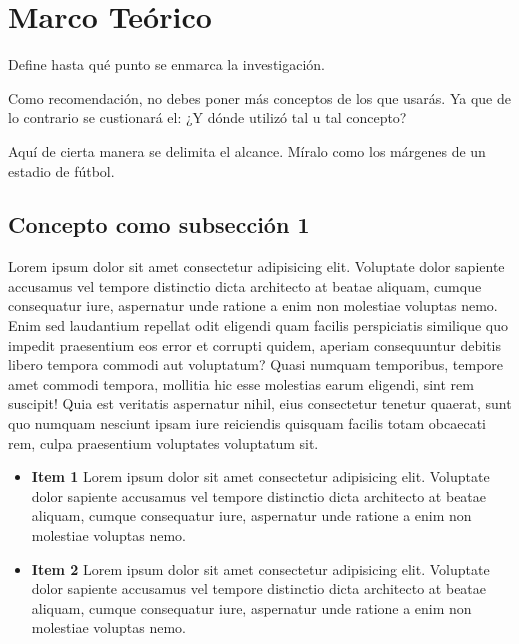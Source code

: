 \section{Marco Teórico}
    \begin{sectext}
        Define hasta qué punto se enmarca la investigación.

        Como recomendación, no debes poner más conceptos de los que usarás. Ya que de lo contrario se custionará el: ¿Y dónde utilizó tal u tal concepto?

        Aquí de cierta manera se delimita el alcance. Míralo como los márgenes de un estadio de fútbol.

        \subsection{Concepto como subsección 1}
            \begin{subsectext}
                Lorem ipsum dolor sit amet consectetur adipisicing elit. Voluptate dolor sapiente accusamus vel tempore distinctio dicta architecto at beatae aliquam, cumque consequatur iure, aspernatur unde ratione a enim non molestiae voluptas nemo. Enim sed laudantium repellat odit eligendi quam facilis perspiciatis similique quo impedit praesentium eos error et corrupti quidem, aperiam consequuntur debitis libero tempora commodi aut voluptatum? Quasi numquam temporibus, tempore amet commodi tempora, mollitia hic esse molestias earum eligendi, sint rem suscipit! Quia est veritatis aspernatur nihil, eius consectetur tenetur quaerat, sunt quo numquam nesciunt ipsam iure reiciendis quisquam facilis totam obcaecati rem, culpa praesentium voluptates voluptatum sit. 

                \begin{itemize}
                    \item \textbf{Item 1}\newline
                    Lorem ipsum dolor sit amet consectetur adipisicing elit. Voluptate dolor sapiente accusamus vel tempore distinctio dicta architecto at beatae aliquam, cumque consequatur iure, aspernatur unde ratione a enim non molestiae voluptas nemo. 

                    \item \textbf{Item 2}\newline
                    Lorem ipsum dolor sit amet consectetur adipisicing elit. Voluptate dolor sapiente accusamus vel tempore distinctio dicta architecto at beatae aliquam, cumque consequatur iure, aspernatur unde ratione a enim non molestiae voluptas nemo.
                \end{itemize}
            \end{subsectext}


\end{sectext}

